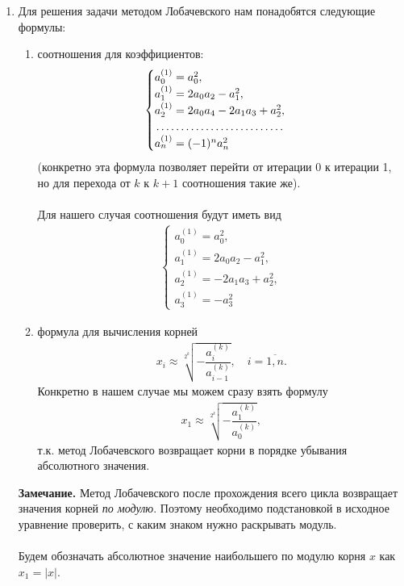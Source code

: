 \documentclass[a4paper, 12pt]{article}
\begin{document}
\begin{enumerate}
		\newpage
		\item 
		\hypertarget{t5}{}
		 Для решения задачи методом Лобачевского нам понадобятся следующие формулы:
		 \begin{enumerate}
		 	\item соотношения для коэффициентов: 
		 	\begin{eqnarray}
		 		\begin{cases}
		 			a_0^{(1)} = a_0^2,\\
		 			a_1^{(1)} =2a_0a_2 - a_1^2,\\
		 			a_2^{(1)} = 2a_0a_4 - 2a_1a_3 + a_2^2,\\
		 			\dotfill\\
		 			a_n^{(1)} = (-1)^na_n^2
		 		\end{cases}
		 	\end{eqnarray}
		 	(конкретно эта формула позволяет перейти от итерации 0 к итерации 1, но для перехода от $k$ к $k+1$ соотношения такие же).\\\\
		 	Для нашего случая соотношения будут иметь вид
		 	\begin{eqnarray}
		 		\begin{cases}
		 			a_0^{(1)} = a_0^2,\\
		 			a_1^{(1)} =2a_0a_2 - a_1^2,\\
		 			a_2^{(1)} = - 2a_1a_3 + a_2^2,\\
		 			a_3^{(1)} = -a_3^2
		 		\end{cases}
		 	\end{eqnarray}
		 	\item формула для вычисления корней \begin{eqnarray}
		 		x_i\approx\sqrt[2^k]{ - \dfrac{a_i^{(k)}}{a_{i-1}^{(k)}}},\quad i =\overline{1,n}.
		 	\end{eqnarray}
		 	Конкретно в нашем случае мы можем сразу взять формулу \begin{eqnarray}
		 		x_1\approx\sqrt[2^k]{ - \dfrac{a_1^{(k)}}{a_{0}^{(k)}}},
		 	\end{eqnarray}
		 	т.к. метод Лобачевского возвращает корни в порядке убывания абсолютного значения.
		 \end{enumerate} 
		 \textbf{Замечание.} Метод Лобачевского после прохождения всего цикла возвращает значения корней \textit{по модулю}. Поэтому необходимо подстановкой в исходное уравнение проверить, с каким знаком нужно раскрывать модуль.\\\\
		 Будем обозначать абсолютное значение наибольшего по модулю корня $x$ как $x_1 = |x|$.

\end{enumerate}
\end{document}
